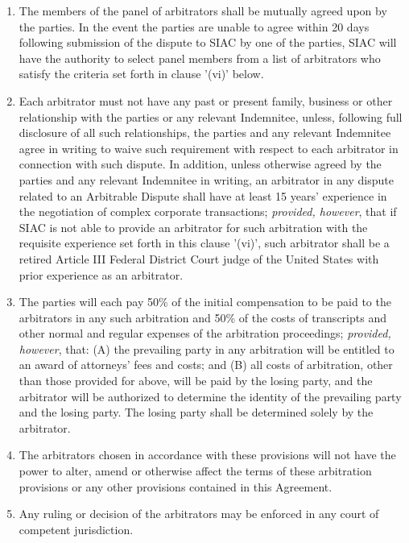 \documentclass{article}
\begin{document}
\begin{enumerate}
\begin{enumerate}
              \item The members of the panel of arbitrators shall be mutually agreed upon by the parties. In the event the parties are unable to agree within 20 days following submission of the dispute to SIAC by one of the parties, SIAC will have the authority to select panel members from a list of arbitrators who satisfy the criteria set forth in clause '(vi)' below.

              \item Each arbitrator must not have any past or present family, business or other relationship with the parties or any relevant Indemnitee, unless, following full disclosure of all such relationships, the parties and any relevant Indemnitee agree in writing to waive such requirement with respect to each arbitrator in connection with such dispute. In addition, unless otherwise agreed by the parties and any relevant Indemnitee in writing, an arbitrator in any dispute related to an Arbitrable Dispute shall have at least 15 years' experience in the negotiation of complex corporate transactions; \textit{provided, however}, that if SIAC is not able to provide an arbitrator for such arbitration with the requisite experience set forth in this clause '(vi)', such arbitrator shall be a retired Article III Federal District Court judge of the United States with prior experience as an arbitrator.

              \item The parties will each pay 50\% of the initial compensation to be paid to the arbitrators in any such arbitration and 50\% of the costs of transcripts and other normal and regular expenses of the arbitration proceedings; \textit{provided, however}, that: (A) the prevailing party in any arbitration will be entitled to an award of attorneys' fees and costs; and (B) all costs of arbitration, other than those provided for above, will be paid by the losing party, and the arbitrator will be authorized to determine the identity of the prevailing party and the losing party. The losing party shall be determined solely by the arbitrator.

              \item The arbitrators chosen in accordance with these provisions will not have the power to alter, amend or otherwise affect the terms of these arbitration provisions or any other provisions contained in this Agreement.

              \item Any ruling or decision of the arbitrators may be enforced in any court of competent jurisdiction.

          \end{enumerate}
\end{enumerate}
\end{document}

